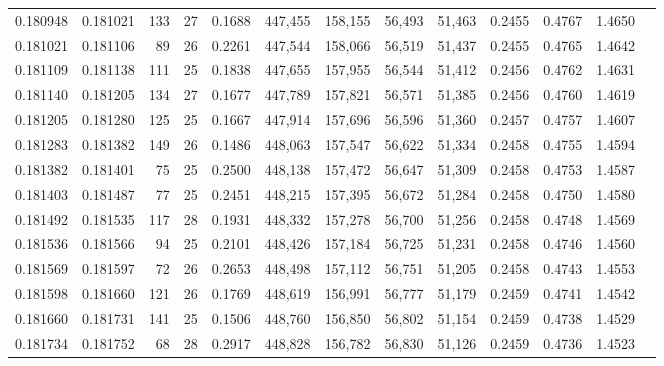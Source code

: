 \begin{tabular}{rrrrrrrrrrrrr}
0.180948 & 0.181021 & 133 &  27 &                                     0.1688 & 447,455 & 158,155 &  56,493 &  51,463 & 0.2455 & 0.4767 & 1.4650 \\
0.181021 & 0.181106 &  89 &  26 &                                     0.2261 & 447,544 & 158,066 &  56,519 &  51,437 & 0.2455 & 0.4765 & 1.4642 \\
0.181109 & 0.181138 & 111 &  25 &                                     0.1838 & 447,655 & 157,955 &  56,544 &  51,412 & 0.2456 & 0.4762 & 1.4631 \\
0.181140 & 0.181205 & 134 &  27 &                                     0.1677 & 447,789 & 157,821 &  56,571 &  51,385 & 0.2456 & 0.4760 & 1.4619 \\
0.181205 & 0.181280 & 125 &  25 &                                     0.1667 & 447,914 & 157,696 &  56,596 &  51,360 & 0.2457 & 0.4757 & 1.4607 \\
0.181283 & 0.181382 & 149 &  26 &                                     0.1486 & 448,063 & 157,547 &  56,622 &  51,334 & 0.2458 & 0.4755 & 1.4594 \\
0.181382 & 0.181401 &  75 &  25 &                                     0.2500 & 448,138 & 157,472 &  56,647 &  51,309 & 0.2458 & 0.4753 & 1.4587 \\
0.181403 & 0.181487 &  77 &  25 &                                     0.2451 & 448,215 & 157,395 &  56,672 &  51,284 & 0.2458 & 0.4750 & 1.4580 \\
0.181492 & 0.181535 & 117 &  28 &                                     0.1931 & 448,332 & 157,278 &  56,700 &  51,256 & 0.2458 & 0.4748 & 1.4569 \\
0.181536 & 0.181566 &  94 &  25 &                                     0.2101 & 448,426 & 157,184 &  56,725 &  51,231 & 0.2458 & 0.4746 & 1.4560 \\
0.181569 & 0.181597 &  72 &  26 &                                     0.2653 & 448,498 & 157,112 &  56,751 &  51,205 & 0.2458 & 0.4743 & 1.4553 \\
0.181598 & 0.181660 & 121 &  26 &                                     0.1769 & 448,619 & 156,991 &  56,777 &  51,179 & 0.2459 & 0.4741 & 1.4542 \\
0.181660 & 0.181731 & 141 &  25 &                                     0.1506 & 448,760 & 156,850 &  56,802 &  51,154 & 0.2459 & 0.4738 & 1.4529 \\
0.181734 & 0.181752 &  68 &  28 &                                     0.2917 & 448,828 & 156,782 &  56,830 &  51,126 & 0.2459 & 0.4736 & 1.4523 \\

\end{tabular}
